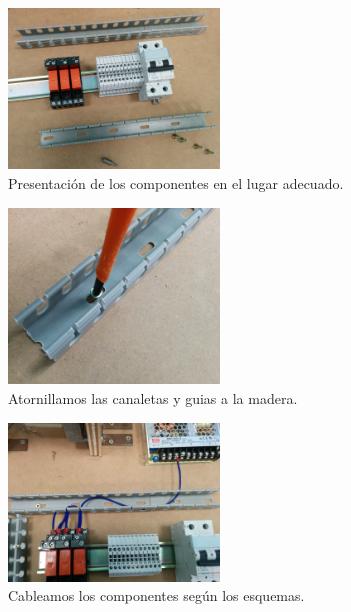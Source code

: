     \begin{figure}[H]
            \centering
            \includegraphics[width=0.5\textwidth]{images/maqueta/IMG_20150324_162200.jpg}
            \caption{Presentación de los componentes en el lugar adecuado.}
            \label{fig:maque_montaje5}
    \end{figure}
    \begin{figure}[H]
            \centering
            \includegraphics[width=0.5\textwidth]{images/maqueta/IMG_20150324_162705.jpg}
            \caption{Atornillamos las canaletas y guias a la madera.}
            \label{fig:maque_montaje6}
    \end{figure}
    \begin{figure}[H]
            \centering
            \includegraphics[width=0.5\textwidth]{images/maqueta/IMG_20150324_173716.jpg}
            \caption{Cableamos los componentes según los esquemas.}
            \label{fig:maque_montaje7}
    \end{figure}
